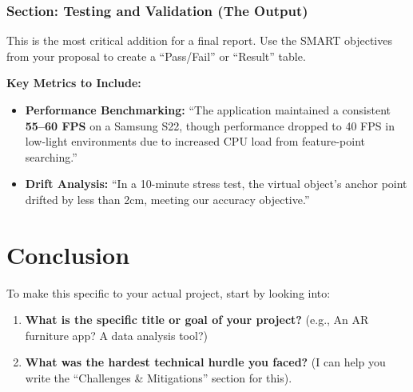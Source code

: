 \documentclass{report}
\begin{document}
\subsection{Section: Testing and Validation (The Output)}

This is the most critical addition for a final report. Use the SMART objectives
from your proposal to create a ``Pass/Fail'' or ``Result'' table.

\textbf{Key Metrics to Include:}

\begin{itemize}
  \item \textbf{Performance Benchmarking:} ``The application maintained a
    consistent \textbf{55--60 FPS} on a Samsung S22, though performance dropped
    to 40 FPS in low-light environments due to increased CPU load from
    feature-point searching.''
  \item \textbf{Drift Analysis:} ``In a 10-minute stress test, the virtual
    object's anchor point drifted by less than 2cm, meeting our accuracy
    objective.''
\end{itemize}

\chapter{Conclusion}

To make this specific to your actual project, start by looking into:

\begin{enumerate}
  \item \textbf{What is the specific title or goal of your project?}
    (e.g., An AR furniture app? A data analysis tool?)
  \item \textbf{What was the hardest technical hurdle you faced?}
    (I can help you write the ``Challenges \& Mitigations'' section for this).
\end{enumerate}
\end{document}
